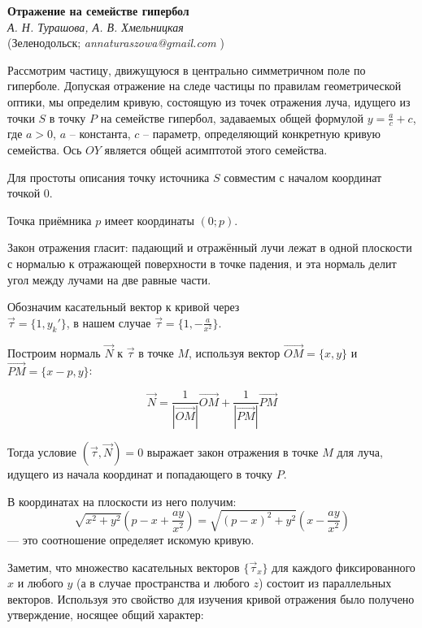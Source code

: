 \begin{center}{ \bf Отражение на семействе гипербол}\\
{\it А. Н. Турашова, А. В. Хмельницкая} \\
(Зеленодольск; {\it annaturaszowa@gmail.com} )
\end{center}

Рассмотрим частицу, движущуюся в центрально симметричном поле по гиперболе. Допуская отражение на следе частицы по правилам геометрической оптики, мы определим кривую, состоящую из точек отражения луча, идущего из точки $S$ в точку $P$ на семействе гипербол, задаваемых общей формулой $y= \frac ac + c$, где $a > 0$, $a$ – константа, $c$ – параметр, определяющий конкретную кривую семейства. Ось $OY$ является общей асимптотой этого семейства.

Для простоты описания точку источника $S$ совместим с началом координат точкой $0$.

Точка приёмника $p$ имеет координаты $(0;p)$.

Закон отражения гласит: падающий и отражённый лучи лежат в одной плоскости с нормалью к отражающей поверхности в точке падения, и эта нормаль делит угол между лучами на две равные части.

Обозначим касательный вектор к кривой через \\ $\vec \tau = \{ 1, y_k' \}$, в нашем случае $\vec \tau = \{ 1,- \frac{a}{x^2} \}$.

Построим нормаль $\vec N$ к $\vec \tau$ в точке $M$, используя вектор $\overrightarrow{OM}=\{x,y\}$ и $\overrightarrow{PM}=\{x-p,y\}$:

$$ \vec{N}=\frac{1}{|\overrightarrow{OM}|}\overrightarrow{OM}+\frac{1}{|\overrightarrow{PM}|}\overrightarrow{PM} $$

Тогда условие $(\vec \tau , \vec N)=0$ выражает закон отражения в точке $M$ для луча, идущего из начала координат и попадающего в точку $P$.

В координатах на плоскости из него получим:
\[
\sqrt{x^2+y^2}
\left( p-x+ \frac{ay}{x^2} \right)
=
\sqrt{{(p-x)}^2+y^2}
\left( x - \frac{ay}{x^2} \right)
\]
    --- это соотношение определяет искомую кривую.

Заметим, что множество касательных векторов $\{ \vec \tau_x \}$ для каждого фиксированного $x$ и любого $y$ (а в случае пространства и любого $z$) состоит из параллельных векторов. Используя это свойство для изучения кривой отражения было получено утверждение, носящее общий характер:

